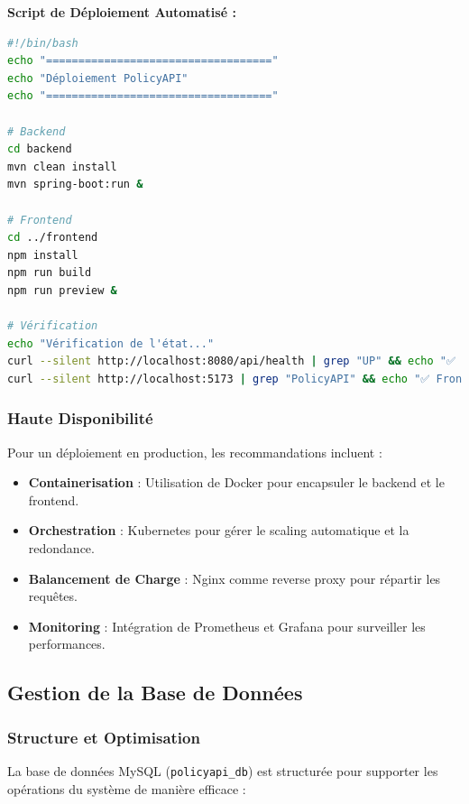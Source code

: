 \documentclass[12pt,a4paper]{article}
\begin{document}
\begin{codebox}
\textbf{Script de Déploiement Automatisé :}
\begin{lstlisting}[language=bash]
#!/bin/bash
echo "==================================="
echo "Déploiement PolicyAPI"
echo "==================================="

# Backend
cd backend
mvn clean install
mvn spring-boot:run &

# Frontend
cd ../frontend
npm install
npm run build
npm run preview &

# Vérification
echo "Vérification de l'état..."
curl --silent http://localhost:8080/api/health | grep "UP" && echo "✅ Backend OK"
curl --silent http://localhost:5173 | grep "PolicyAPI" && echo "✅ Frontend OK"
\end{lstlisting}
\end{codebox}

\subsubsection{Haute Disponibilité}

Pour un déploiement en production, les recommandations incluent :
\begin{itemize}
\item \textbf{Containerisation} : Utilisation de Docker pour encapsuler le backend et le frontend.
\item \textbf{Orchestration} : Kubernetes pour gérer le scaling automatique et la redondance.
\item \textbf{Balancement de Charge} : Nginx comme reverse proxy pour répartir les requêtes.
\item \textbf{Monitoring} : Intégration de Prometheus et Grafana pour surveiller les performances.
\end{itemize}

\subsection{Gestion de la Base de Données}

\subsubsection{Structure et Optimisation}

La base de données MySQL (\texttt{policyapi_db}) est structurée pour supporter les opérations du système de manière efficace :
\end{document}
